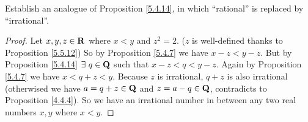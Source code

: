 \begin{exercise}\label{ex 5.5.5}
    Establish an analogue of Proposition \ref{5.4.14}, in which ``rational'' is replaced by ``irrational''.
\end{exercise}

\begin{proof}
    Let \(x, y, z \in \mathbf{R}\) where \(x < y\) and \(z^2 = 2\).
    (\(z\) is well-defined thanks to Proposition \ref{5.5.12})
    So by Proposition \ref{5.4.7} we have \(x - z < y - z\).
    But by Proposition \ref{5.4.14} \(\exists\ q \in \Q\) such that \(x - z < q < y - z\).
    Again by Proposition \ref{5.4.7} we have \(x < q + z < y\).
    Because \(z\) is irrational, \(q + z\) is also irrational
    (otherwised we have \(a = q + z \in \mathbf{Q}\) and \(z = a - q \in \mathbf{Q}\), contradicts to Proposition \ref{4.4.4}).
    So we have an irrational number in between any two real numbers \(x, y\) where \(x < y\).
\end{proof}